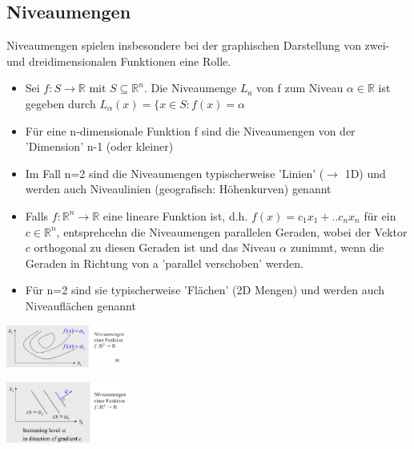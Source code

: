\documentclass{report}
\newenvironment{Figure}
	{\par\medskip\noindent\minipage{\linewidth}}
	{\endminipage\par\medskip}
\theoremstyle{definition}
\theoremstyle{example}
\begin{document}
   \subsection{Niveaumengen}
Niveaumengen spielen insbesondere bei der graphischen Darstellung von zwei- und dreidimensionalen Funktionen eine Rolle.
\begin{itemize}
   \item Sei $f: S \rightarrow \mathbb{R}$ mit $S \subseteq \mathbb{R}^n$. Die Niveaumenge $L_a$ von f zum Niveau $\alpha \in \mathbb{R}$ ist gegeben durch $L_\alpha (x) = \{ x \in S: f(x) = \alpha$
   \item Für eine n-dimensionale Funktion f sind die Niveaumengen von der 'Dimension' n-1 (oder kleiner)
   \item Im Fall n=2 sind die Niveaumengen typischerweise 'Linien' ($\rightarrow$ 1D) und werden auch Niveaulinien (geografisch: Höhenkurven) genannt
   \item Falls $f: \mathbb{R}^n \rightarrow \mathbb{R}$ eine lineare Funktion ist, d.h. $f(x) = c_1 x_1 + .. c_n x_n$ für ein $c \in \mathbb{R}^n$, entsprehcehn die Niveaumengen parallelen Geraden, wobei der Vektor $c$
   orthogonal zu diesen Geraden ist und das Niveau $\alpha$ zunimmt, wenn die Geraden in Richtung von a 'parallel verschoben' werden.
   \item Für n=2 sind sie typischerweise 'Flächen' (2D Mengen) und werden auch Niveauflächen genannt
\end{itemize}

\begin{Figure}
\centering
\includegraphics[width=150px]{img/Niveaumengen.png}
	\label{fig:Abbildung von Niveaumengen}
\end{Figure}

\begin{Figure}
\centering
\includegraphics[width=150px]{img/NiveaumengenOrtho.png}
	\label{fig:Abbildung von Niveaumengen II}
\end{Figure}
\end{document}
